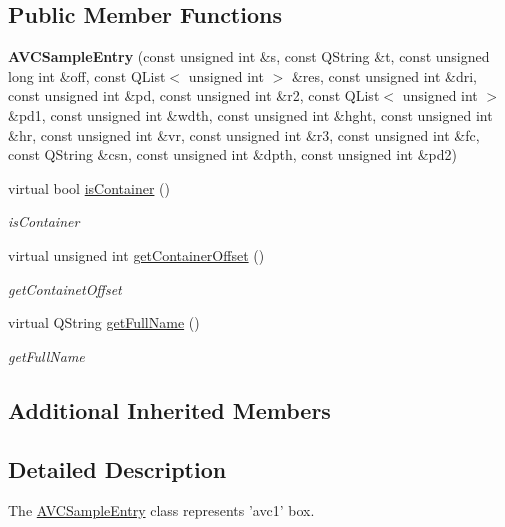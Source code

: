 \subsection*{Public Member Functions}
\begin{DoxyCompactItemize}
\item 
\hypertarget{class_a_v_c_sample_entry_aea6d332603301401069ad12c139384cb}{{\bfseries A\-V\-C\-Sample\-Entry} (const unsigned int \&s, const Q\-String \&t, const unsigned long int \&off, const Q\-List$<$ unsigned int $>$ \&res, const unsigned int \&dri, const unsigned int \&pd, const unsigned int \&r2, const Q\-List$<$ unsigned int $>$ \&pd1, const unsigned int \&wdth, const unsigned int \&hght, const unsigned int \&hr, const unsigned int \&vr, const unsigned int \&r3, const unsigned int \&fc, const Q\-String \&csn, const unsigned int \&dpth, const unsigned int \&pd2)}\label{class_a_v_c_sample_entry_aea6d332603301401069ad12c139384cb}

\item 
virtual bool \hyperlink{class_a_v_c_sample_entry_ae0627e8954e878a70c9a67e337fd5d26}{is\-Container} ()
\begin{DoxyCompactList}\small\item\em is\-Container \end{DoxyCompactList}\item 
virtual unsigned int \hyperlink{class_a_v_c_sample_entry_ab65d3ccefc8bcf0a0157d66189ecf8d8}{get\-Container\-Offset} ()
\begin{DoxyCompactList}\small\item\em get\-Containet\-Offset \end{DoxyCompactList}\item 
virtual Q\-String \hyperlink{class_a_v_c_sample_entry_a672f849ea0bd16cb832d1592ff8ae827}{get\-Full\-Name} ()
\begin{DoxyCompactList}\small\item\em get\-Full\-Name \end{DoxyCompactList}\end{DoxyCompactItemize}
\subsection*{Additional Inherited Members}


\subsection{Detailed Description}
The \hyperlink{class_a_v_c_sample_entry}{A\-V\-C\-Sample\-Entry} class represents 'avc1' box. 

